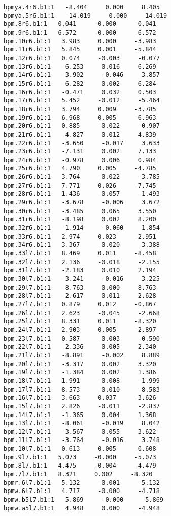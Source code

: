 \begin{verbatim}
bpmya.4r6.b1:1   -8.404     0.000     8.405
bpmya.5r6.b1:1   -14.019     0.000     14.019
bpm.8r6.b1:1   0.041     -0.000     -0.041
bpm.9r6.b1:1   6.572     -0.000     -6.572
bpm.10r6.b1:1   3.983     0.000     -3.983
bpm.11r6.b1:1   5.845     0.001     -5.844
bpm.12r6.b1:1   0.074     -0.003     -0.077
bpm.13r6.b1:1   -6.253     0.016     6.269
bpm.14r6.b1:1   -3.902     -0.046     3.857
bpm.15r6.b1:1   -6.282     0.002     6.284
bpm.16r6.b1:1   -0.471     0.032     0.503
bpm.17r6.b1:1   5.452     -0.012     -5.464
bpm.18r6.b1:1   3.794     0.009     -3.785
bpm.19r6.b1:1   6.968     0.005     -6.963
bpm.20r6.b1:1   0.885     -0.022     -0.907
bpm.21r6.b1:1   -4.827     0.012     4.839
bpm.22r6.b1:1   -3.650     -0.017     3.633
bpm.23r6.b1:1   -7.131     0.002     7.133
bpm.24r6.b1:1   -0.978     0.006     0.984
bpm.25r6.b1:1   4.790     0.005     -4.785
bpm.26r6.b1:1   3.764     -0.022     -3.785
bpm.27r6.b1:1   7.771     0.026     -7.745
bpm.28r6.b1:1   1.436     -0.057     -1.493
bpm.29r6.b1:1   -3.678     -0.006     3.672
bpm.30r6.b1:1   -3.485     0.065     3.550
bpm.31r6.b1:1   -8.198     0.002     8.200
bpm.32r6.b1:1   -1.914     -0.060     1.854
bpm.33r6.b1:1   2.974     0.023     -2.951
bpm.34r6.b1:1   3.367     -0.020     -3.388
bpm.33l7.b1:1   8.469     0.011     -8.458
bpm.32l7.b1:1   2.136     -0.018     -2.155
bpm.31l7.b1:1   -2.183     0.010     2.194
bpm.30l7.b1:1   -3.241     -0.016     3.225
bpm.29l7.b1:1   -8.763     0.000     8.763
bpm.28l7.b1:1   -2.617     0.011     2.628
bpm.27l7.b1:1   0.879     0.012     -0.867
bpm.26l7.b1:1   2.623     -0.045     -2.668
bpm.25l7.b1:1   8.331     0.011     -8.320
bpm.24l7.b1:1   2.903     0.005     -2.897
bpm.23l7.b1:1   0.587     -0.003     -0.590
bpm.22l7.b1:1   -2.336     0.005     2.340
bpm.21l7.b1:1   -8.891     -0.002     8.889
bpm.20l7.b1:1   -3.317     0.002     3.320
bpm.19l7.b1:1   -1.384     0.002     1.386
bpm.18l7.b1:1   1.991     -0.008     -1.999
bpm.17l7.b1:1   8.573     -0.010     -8.583
bpm.16l7.b1:1   3.663     0.037     -3.626
bpm.15l7.b1:1   2.826     -0.011     -2.837
bpm.14l7.b1:1   -1.365     0.004     1.368
bpm.13l7.b1:1   -8.061     -0.019     8.042
bpm.12l7.b1:1   -3.567     0.055     3.622
bpm.11l7.b1:1   -3.764     -0.016     3.748
bpm.10l7.b1:1   0.613     0.005     -0.608
bpm.9l7.b1:1   5.073     -0.000     -5.073
bpm.8l7.b1:1   4.475     -0.004     -4.479
bpm.7l7.b1:1   8.321     0.002     -8.320
bpmr.6l7.b1:1   5.132     -0.001     -5.132
bpmw.6l7.b1:1   4.717     -0.000     -4.718
bpmw.b5l7.b1:1   5.869     -0.000     -5.869
bpmw.a5l7.b1:1   4.948     0.000     -4.948

\end{verbatim}

